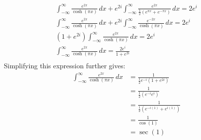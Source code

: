 \documentclass[letterpaper, titlepage, DIV=14]{scrartcl}
\begin{document}
\begin{enumerate}[i)]
\begin{align*}
    \end{align*}
    \begin{gather*}
      \int_{-\infty}^{\infty} \frac{e^{2x}}{\cosh(\pi x)} \, dx + e^{2i}\int_{-\infty}^{\infty} \frac{e^{2x}}{\frac{1}{2}(e^{\pi x}+e^{-\pi x})} \, dx = 2e^{i} \\
      \int_{-\infty}^{\infty} \frac{e^{2x}}{\cosh(\pi x)} \, dx + e^{2i}\int_{-\infty}^{\infty} \frac{e^{-2x}}{\cosh(\pi x)} \, dx = 2e^{i} \\
      (1+e^{2i})\int_{-\infty}^{\infty} \frac{e^{2x}}{\cosh(\pi x)} \, dx = 2e^{i} \\
      \int_{-\infty}^{\infty} \frac{e^{2x}}{\cosh(\pi x)} \, dx = \frac{2e^{i}}{1+e^{2i}} \\
    \end{gather*}
    Simplifying this expression further gives:
    \begin{align*}
      \int_{-\infty}^{\infty} \frac{e^{2x}}{\cosh(\pi x)} \, dx &= \frac{1}{\frac{1}{2}e^{-i}(1+e^{2i})} \\
        &= \frac{1}{\frac{1}{2}(e^{-i}e^{i})} \\
        &= \frac{1}{\frac{1}{2}(e^{-i(1)}+e^{i(1)})} \\
        &= \frac{1}{\cos(1)} \\
        &= \sec(1)
    \end{align*}
    \end{enumerate}
\end{document}
